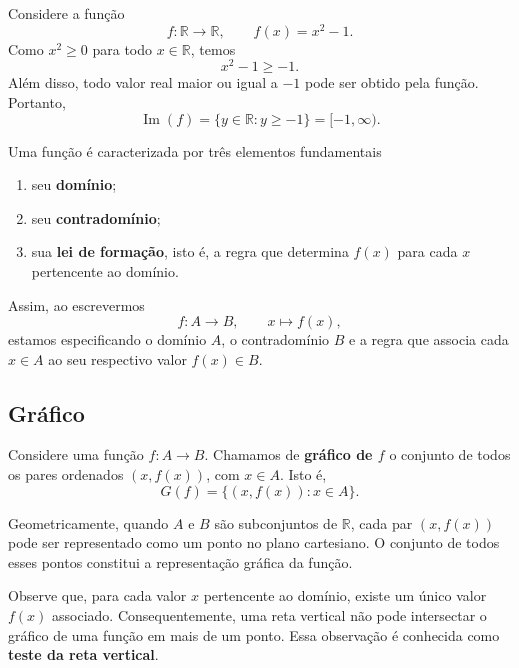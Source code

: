 \begin{example}
    Considere a função
    \begin{equation}
        f:\mathbb{R}\longrightarrow\mathbb{R},
        \qquad
        f(x)=x^2-1.
    \end{equation}
    Como $x^2\geq0$ para todo $x\in\mathbb{R}$, temos
    \begin{equation}
        x^2-1\geq-1.
    \end{equation}
    Além disso, todo valor real maior ou igual a $-1$ pode ser obtido pela função. Portanto,
    \begin{equation}
        \operatorname{Im}(f)
        =\{y\in\mathbb{R}:y\geq-1\}
        =[-1,\infty).
    \end{equation}
\end{example}

Uma função é caracterizada por três elementos fundamentais
\begin{enumerate}
    \item seu \textbf{domínio};
    \item seu \textbf{contradomínio};
    \item sua \textbf{lei de formação}, isto é, a regra que determina $f(x)$ para cada $x$ pertencente ao domínio.
\end{enumerate}

Assim, ao escrevermos
\begin{equation}
    f:A\longrightarrow B,
    \qquad
    x\longmapsto f(x),
\end{equation}
estamos especificando o domínio $A$, o contradomínio $B$ e a regra que associa cada $x\in A$ ao seu respectivo valor $f(x)\in B$.

\subsection{Gráfico}

Considere uma função $f:A\to B$. Chamamos de \textbf{gráfico de $f$} o conjunto de todos os pares ordenados $(x,f(x))$, com $x\in A$. Isto é,
\begin{equation*}
    G(f)=\{(x,f(x)):x\in A\}.
\end{equation*}

Geometricamente, quando $A$ e $B$ são subconjuntos de $\mathbb{R}$, cada par $(x,f(x))$ pode ser representado como um ponto no plano cartesiano. O conjunto de todos esses pontos constitui a representação gráfica da função.

Observe que, para cada valor $x$ pertencente ao domínio, existe um único valor $f(x)$ associado. Consequentemente, uma reta vertical não pode intersectar o gráfico de uma função em mais de um ponto. Essa observação é conhecida como \textbf{teste da reta vertical}.

